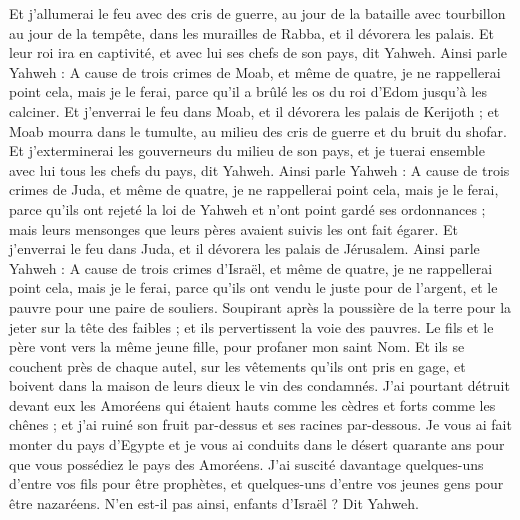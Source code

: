 \begin{multicols}{2}
Et j'allumerai le feu avec des cris de guerre, au jour de la bataille avec tourbillon au jour de la tempête, dans les murailles de Rabba, et il dévorera les palais. 
Et leur roi ira en captivité, et avec lui ses chefs de son pays, dit Yahweh.
\VerseOne{}Ainsi parle Yahweh : A cause de trois crimes de Moab, et même de quatre, je ne rappellerai point cela, mais je le ferai, parce qu'il a brûlé les os du roi d'Edom jusqu'à les calciner.
Et j'enverrai le feu dans Moab, et il dévorera les palais de Kerijoth ; et Moab mourra dans le tumulte, au milieu des cris de guerre et du bruit du shofar.
Et j'exterminerai les gouverneurs du milieu de son pays, et je tuerai ensemble avec lui tous les chefs du pays, dit Yahweh.
Ainsi parle Yahweh : A cause de trois crimes de Juda, et même de quatre, je ne rappellerai point cela, mais je le ferai, parce qu'ils ont rejeté la loi de Yahweh et n'ont point gardé ses ordonnances ; mais leurs mensonges que leurs pères avaient suivis les ont fait égarer. 
Et j'enverrai le feu dans Juda, et il dévorera les palais de Jérusalem.
Ainsi parle Yahweh : A cause de trois crimes d'Israël, et même de quatre, je ne rappellerai point cela, mais je le ferai, parce qu'ils ont vendu le juste pour de l'argent, et le pauvre pour une paire de souliers.
Soupirant après la poussière de la terre pour la jeter sur la tête des faibles ; et ils pervertissent la voie des pauvres. Le fils et le père vont vers la même jeune fille, pour profaner mon saint Nom.
Et ils se couchent près de chaque autel, sur les vêtements qu'ils ont pris en gage, et boivent dans la maison de leurs dieux le vin des condamnés.
J'ai pourtant détruit devant eux les Amoréens qui étaient hauts comme les cèdres et forts comme les chênes ; et j'ai ruiné son fruit par-dessus et ses racines par-dessous.
Je vous ai fait monter du pays d'Egypte et je vous ai conduits dans le désert quarante ans pour que vous possédiez le pays des Amoréens.
J'ai suscité davantage quelques-uns d'entre vos fils pour être prophètes, et quelques-uns d'entre vos jeunes gens pour être nazaréens. N'en est-il pas ainsi, enfants d'Israël ? Dit Yahweh.

\end{multicols}
